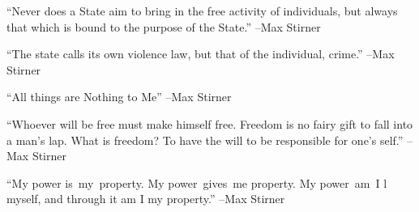 \documentclass{article}%
\begin{document}
\linebreak%
\vspace{1mm}%
\begin{minipage}{\textwidth}%
\flushleft%
“Never does a State aim to bring in the free activity of individuals, but always that which is bound to the purpose of the State.”%
\linebreak%
\vspace{1mm}%
–Max Stirner%
\linebreak%
\vspace{1mm}%
\end{minipage}%
\linebreak%
\vspace{1mm}%
\begin{minipage}{\textwidth}%
\flushleft%
“The state calls its own violence law, but that of the individual, crime.”%
\linebreak%
\vspace{1mm}%
–Max Stirner%
\linebreak%
\vspace{1mm}%
\end{minipage}%
\linebreak%
\vspace{1mm}%
\begin{minipage}{\textwidth}%
\flushleft%
“All things are Nothing to Me”%
\linebreak%
\vspace{1mm}%
–Max Stirner%
\linebreak%
\vspace{1mm}%
\end{minipage}%
\linebreak%
\vspace{1mm}%
\begin{minipage}{\textwidth}%
\flushleft%
“Whoever will be free must make himself free. Freedom is no fairy gift to fall into a man's lap. What is freedom? To have the will to be responsible for one's self.”%
\linebreak%
\vspace{1mm}%
–Max Stirner%
\linebreak%
\vspace{1mm}%
\end{minipage}%
\linebreak%
\vspace{1mm}%
\begin{minipage}{\textwidth}%
\flushleft%
“My power is~my~property. My power~gives~me property. My power~am~I l myself, and through it am I my property.”%
\linebreak%
\vspace{1mm}%
–Max Stirner%
\linebreak%
\vspace{1mm}%
\end{minipage}%
\end{document}
